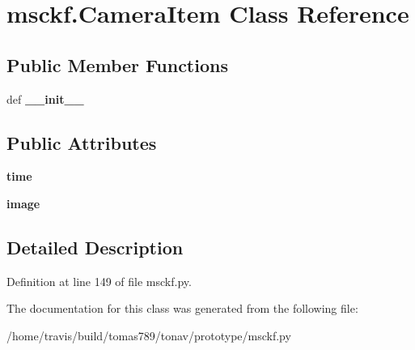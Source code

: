 \hypertarget{classmsckf_1_1_camera_item}{\section{msckf.\-Camera\-Item Class Reference}
\label{classmsckf_1_1_camera_item}
}
\subsection*{Public Member Functions}
\begin{DoxyCompactItemize}
\item 
\hypertarget{classmsckf_1_1_camera_item_ab25d363d08d1af7d925814b54d2a5933}{def {\bfseries \-\_\-\-\_\-init\-\_\-\-\_\-}}\label{classmsckf_1_1_camera_item_ab25d363d08d1af7d925814b54d2a5933}

\end{DoxyCompactItemize}
\subsection*{Public Attributes}
\begin{DoxyCompactItemize}
\item 
\hypertarget{classmsckf_1_1_camera_item_ad559a375ad268d16a93220455ecbe38a}{{\bfseries time}}\label{classmsckf_1_1_camera_item_ad559a375ad268d16a93220455ecbe38a}

\item 
\hypertarget{classmsckf_1_1_camera_item_a8d1e979360ecbde8620b03be8760dba8}{{\bfseries image}}\label{classmsckf_1_1_camera_item_a8d1e979360ecbde8620b03be8760dba8}

\end{DoxyCompactItemize}


\subsection{Detailed Description}


Definition at line 149 of file msckf.\-py.



The documentation for this class was generated from the following file\-:\begin{DoxyCompactItemize}
\item 
/home/travis/build/tomas789/tonav/prototype/msckf.\-py\end{DoxyCompactItemize}
